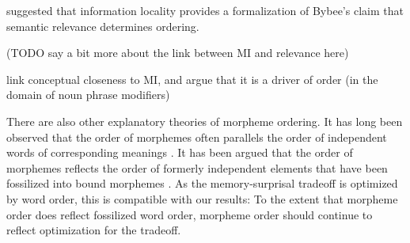 \documentclass[11pt,letterpaper]{article}
\newcommand\mhahn[1]{{\color{red}(#1)}}
\newcommand\becky[1]{{\color{blue}(#1)}}
\begin{document}
\cite{Hahn2020modeling} suggested that information locality provides a formalization of Bybee's \citep{bybee-morphology-1985} claim that semantic relevance determines ordering.

\mhahn{TODO say a bit more about the link between MI and relevance here}

\citep{culbertson2020from} link conceptual closeness to MI, and argue that it is a driver of order (in the domain of noun phrase modifiers)






There are also other explanatory theories of morpheme ordering.
It has long been observed that the order of morphemes often parallels the order of independent words of corresponding meanings \citep{givon1971historical,venneman1973explanation,baker1985the}.
It has been argued that the order of morphemes reflects the order of formerly independent elements that have been fossilized into bound morphemes \citet{givon1971historical,venneman1973explanation}.
As the memory-surprisal tradeoff is optimized by word order, this is compatible with our results:
To the extent that morpheme order does reflect fossilized word order, morpheme order should continue to reflect optimization for the tradeoff.
\end{document}

